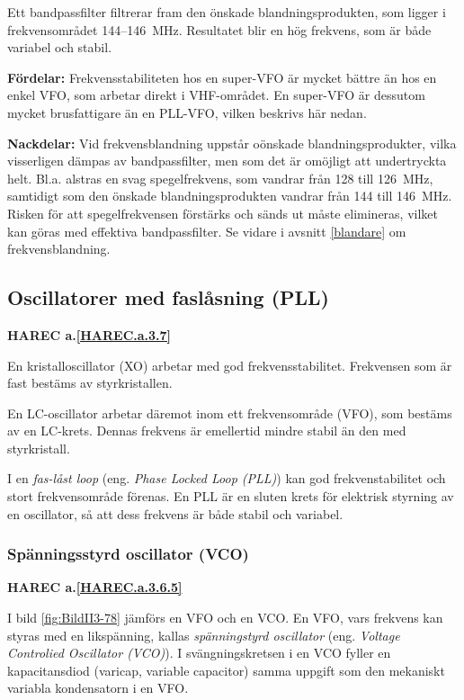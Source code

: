 Ett bandpassfilter filtrerar fram den önskade blandningsprodukten, som
ligger i frekvensområdet 144--146~MHz.
Resultatet blir en hög frekvens, som är både variabel och stabil.

\textbf{Fördelar:}
Frekvensstabiliteten hos en super-VFO är mycket bättre än hos en enkel VFO,
som arbetar direkt i VHF-området.
En super-VFO är dessutom mycket brusfattigare än en PLL-VFO, vilken
beskrivs här nedan.

\textbf{Nackdelar:}
Vid frekvensblandning uppstår oönskade blandningsprodukter, vilka visserligen
dämpas av bandpassfilter, men som det är omöjligt att undertryckta helt.
Bl.a. alstras en svag spegelfrekvens, som vandrar från 128 till 126~MHz,
samtidigt som den önskade blandningsprodukten vandrar från 144 till 146~MHz.
Risken för att spegelfrekvensen förstärks och sänds ut måste elimineras,
vilket kan göras med effektiva bandpassfilter.
Se vidare i avsnitt \ref{blandare} om frekvensblandning.

\subsection{Oscillatorer med faslåsning (PLL)}
\textbf{HAREC
  a.\ref{HAREC.a.3.7}\label{myHAREC.a.3.7}
}

En kristalloscillator (XO) arbetar med god frekvensstabilitet.
Frekvensen som är fast bestäms av styrkristallen.

En LC-oscillator arbetar däremot inom ett frekvensområde (VFO), som
bestäms av en LC-krets.
Dennas frekvens är emellertid mindre stabil än den med styrkristall.

I en \emph{fas-låst loop} (eng. \emph{Phase Locked Loop (PLL)}) kan god
frekvenstabilitet och stort frekvensområde förenas.
En PLL är en sluten krets för elektrisk styrning av en oscillator, så att dess
frekvens är både stabil och variabel.

\subsubsection{Spänningsstyrd oscillator (VCO)}
\textbf{HAREC a.\ref{HAREC.a.3.6.5}\label{myHAREC.a.3.6.5}}

I bild \ref{fig:BildII3-78} jämförs en VFO och en VCO.
En VFO, vars frekvens kan styras med en likspänning, kallas
\emph{spänningstyrd oscillator} (eng. \emph{Voltage Controlied Oscillator
  (VCO)}).
I svängningskretsen i en VCO fyller en kapacitansdiod (varicap, variable
capacitor) samma uppgift som den mekaniskt variabla kondensatorn i en VFO.

